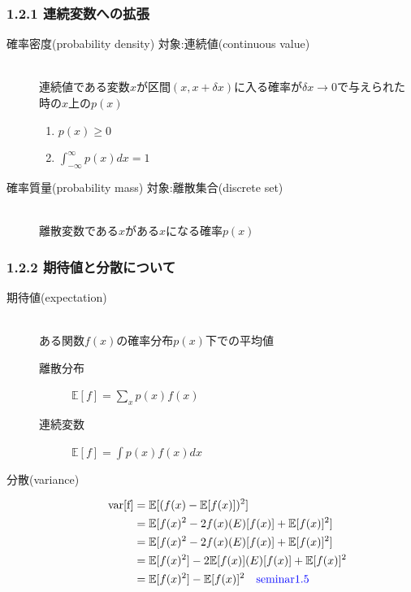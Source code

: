 \documentclass[dvipdfmx]{beamer}
\theoremstyle{definition}
\begin{document}
\begin{frame}
  \frametitle{1.2.1 連続変数への拡張}
  \begin{description}
    \item[確率密度(probability density) 対象:連続値(continuous value)] \hfill \\
      連続値である変数$x$が区間$(x,x + \delta x)$に入る確率が$\delta x \to 0$で与えられた時の$x$上の$p(x)$
      \\
      \begin{enumerate}
        \item $p(x) \geq 0$
        \item $\int_{-\infty}^{\infty} p(x) dx = 1$
      \end{enumerate}
    \item[確率質量(probability mass) 対象:離散集合(discrete set)] \hfill \\
      離散変数である$x$がある$x$になる確率$p(x)$
    \end{description}
\end{frame}

\begin{frame}
  \frametitle{1.2.2 期待値と分散について}
  \begin{description}
    \item[期待値(expectation)] \hfill \\
      ある関数$f(x)$の確率分布$p(x)$下での平均値
    \begin{description}
      \item[離散分布] $\mathbb{E}[f] = \sum_{x} p(x)f(x)$
      \item[連続変数] $\mathbb{E}[f] = \int p(x)f(x)dx$
    \end{description}
    \item[分散(variance)]
    \begin{align*}
      \rm{var}[f] &= \mathbb{E}[(f(x)-\mathbb{E}[f(x)])^2] \\
                  &= \mathbb{E}[f(x)^2 -2f(x)\mathbb(E)[f(x)]  + \mathbb{E}[f(x)]^2] \\
                  &= \mathbb{E}[f(x)^2 -2f(x)\mathbb(E)[f(x)]  + \mathbb{E}[f(x)]^2] \\
                  &= \mathbb{E}[f(x)^2] -2\mathbb{E}[f(x)]\mathbb(E)[f(x)]  + \mathbb{E}[f(x)]^2 \\
                  &= \mathbb{E}[f(x)^2] -\mathbb{E}[f(x)]^2 \quad \textcolor{blue}{\rm{seminar1.5}}
    \end{align*}
  \end{description}
\end{frame}
\end{document}
